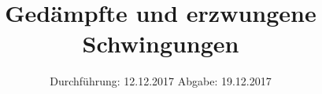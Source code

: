 

\subject{354}
\title{Gedämpfte und erzwungene Schwingungen}
\date{%
  Durchführung: 12.12.2017
  \hspace{3em}
  Abgabe: 19.12.2017
}



\maketitle
\thispagestyle{empty}
\tableofcontents
\newpage






\printbibliography{}



